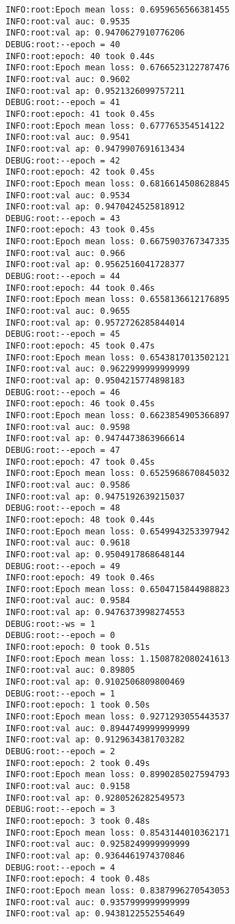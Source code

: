 \documentclass[11pt]{article}
\begin{document}
\begin{verbatim}
INFO:root:Epoch mean loss: 0.6959656566381455
INFO:root:val auc: 0.9535
INFO:root:val ap: 0.9470627910776206
DEBUG:root:--epoch = 40
INFO:root:epoch: 40 took 0.44s
INFO:root:Epoch mean loss: 0.6766523122787476
INFO:root:val auc: 0.9602
INFO:root:val ap: 0.9521326099757211
DEBUG:root:--epoch = 41
INFO:root:epoch: 41 took 0.45s
INFO:root:Epoch mean loss: 0.677765354514122
INFO:root:val auc: 0.9541
INFO:root:val ap: 0.9479907691613434
DEBUG:root:--epoch = 42
INFO:root:epoch: 42 took 0.45s
INFO:root:Epoch mean loss: 0.6816614508628845
INFO:root:val auc: 0.9534
INFO:root:val ap: 0.9470424525818912
DEBUG:root:--epoch = 43
INFO:root:epoch: 43 took 0.45s
INFO:root:Epoch mean loss: 0.6675903767347335
INFO:root:val auc: 0.966
INFO:root:val ap: 0.9562516041728377
DEBUG:root:--epoch = 44
INFO:root:epoch: 44 took 0.46s
INFO:root:Epoch mean loss: 0.6558136612176895
INFO:root:val auc: 0.9655
INFO:root:val ap: 0.9572726285844014
DEBUG:root:--epoch = 45
INFO:root:epoch: 45 took 0.47s
INFO:root:Epoch mean loss: 0.6543817013502121
INFO:root:val auc: 0.9622999999999999
INFO:root:val ap: 0.9504215774898183
DEBUG:root:--epoch = 46
INFO:root:epoch: 46 took 0.45s
INFO:root:Epoch mean loss: 0.6623854905366897
INFO:root:val auc: 0.9598
INFO:root:val ap: 0.9474473863966614
DEBUG:root:--epoch = 47
INFO:root:epoch: 47 took 0.45s
INFO:root:Epoch mean loss: 0.6525968670845032
INFO:root:val auc: 0.9586
INFO:root:val ap: 0.9475192639215037
DEBUG:root:--epoch = 48
INFO:root:epoch: 48 took 0.44s
INFO:root:Epoch mean loss: 0.6549943253397942
INFO:root:val auc: 0.9618
INFO:root:val ap: 0.9504917868648144
DEBUG:root:--epoch = 49
INFO:root:epoch: 49 took 0.46s
INFO:root:Epoch mean loss: 0.6504715844988823
INFO:root:val auc: 0.9584
INFO:root:val ap: 0.9476373998274553
DEBUG:root:-ws = 1
DEBUG:root:--epoch = 0
INFO:root:epoch: 0 took 0.51s
INFO:root:Epoch mean loss: 1.1508782080241613
INFO:root:val auc: 0.89805
INFO:root:val ap: 0.9102506809800469
DEBUG:root:--epoch = 1
INFO:root:epoch: 1 took 0.50s
INFO:root:Epoch mean loss: 0.9271293055443537
INFO:root:val auc: 0.8944749999999999
INFO:root:val ap: 0.9129634381703282
DEBUG:root:--epoch = 2
INFO:root:epoch: 2 took 0.49s
INFO:root:Epoch mean loss: 0.8990285027594793
INFO:root:val auc: 0.9158
INFO:root:val ap: 0.9280526282549573
DEBUG:root:--epoch = 3
INFO:root:epoch: 3 took 0.48s
INFO:root:Epoch mean loss: 0.8543144010362171
INFO:root:val auc: 0.9258249999999999
INFO:root:val ap: 0.9364461974370846
DEBUG:root:--epoch = 4
INFO:root:epoch: 4 took 0.48s
INFO:root:Epoch mean loss: 0.8387996270543053
INFO:root:val auc: 0.9357999999999999
INFO:root:val ap: 0.9438122552554649

\end{verbatim}
\end{document}
